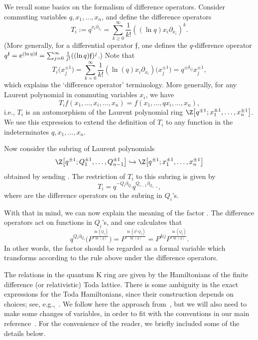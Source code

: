 We recall some basics on the formalism of difference operators. Consider commuting
variables $q, x_1, \dots, x_n$, and define the difference operators
\[
T_i:= q^{x_i \partial_{x_i}} = \sum_{ k \ge 0}^\infty \frac{1}{k!}((\ln q)x_i \partial_{x_i} )^k.
\]
\big(More generally, for a differential operator $\mathfrak{f}$, one defines the $q$-difference operator $q^{\mathfrak{f}}={\rm e}^{(\ln q) \mathfrak{f}}=\sum_{j=0}^\infty \frac{1}{j!}((\ln q)\mathfrak{f})^j$.\big) Note that
\[
T_i \bigl(x_j^{\pm 1}\bigr) = \sum_{k=0}^\infty \frac{1}{k!} ( \ln(q) x_i \partial_{x_i} ) \bigl(x_j^{\pm 1}\bigr) = q^{\pm \delta_{ij}} x_j^{\pm 1} ,
\]
which explains the `difference operator' terminology. More generally, for any Laurent polynomial in commuting variables $x_i$, we have
\[
T_i f(x_1,\dots,x_i,\dots,x_n) = f(x_1,\dots,qx_i,\dots, x_n) ,
\]
i.e., $T_i$ is an automorphism of the Laurent polynomial ring
$\Z\bigl[q^{\pm 1}; x_1^{\pm 1}, \dots, x_{n}^{\pm 1}\bigr]$.
We use this expression to extend the definition of $T_i$ to any function in the indeterminates $q, x_1, \dots, x_n$.

Now consider the subring of Laurent polynomials
\[
\Z\bigl[q^{\pm 1}; Q_1^{\pm 1}, \dots, Q_{n-1}^{\pm 1}\bigr] \hookrightarrow \Z\bigl[q^{\pm 1}; x_1^{\pm 1}, \dots, x_{n}^{\pm 1}\bigr]
\]
obtained by sending . The restriction of $T_i$ to this subring is given by
\begin{equation}\label{E: TiQ}
T_i = q^{-Q_{i}\partial_{Q_{i}}}q^{Q_{i-1}\partial_{Q_{i-1}}} ,
\end{equation}
where  are the difference operators on the subring in $Q_i$'s.

With that in mind, we can now explain the meaning of the factor .
The difference operators  act on functions in $Q_i$'s, and
one calculates that
\[ q^{Q_i \partial_{Q_i}}\bigl(P^{\frac{\ln(Q_j)}{\ln(q)}}\bigr) =
P^{\frac{\ln(q^{\delta_{ij}} Q_j)}{\ln(q)}} = P^{\delta{ij}}
P^{\frac{\ln(Q_j)}{\ln(q)}} . \]
In other words, the factor  should be regarded as
a formal variable
which transforms according to the rule above under the difference operators.

The relations in the quantum K ring are given by the Hamiltonians of the finite difference
(or relativistic) Toda lattice. There is some ambiguity in the exact expressions for the
Toda Hamiltonians, since their construction depends on choices;
see, e.g.,~\cite[Remark~5]{givental_lee}. We follow here the approach from~\cite{gloI},
but we will also need to make some changes of variables,
in order to fit with the conventions in our main reference~\cite{givental_lee}.
For the convenience of the reader, we briefly included some of the details below.

